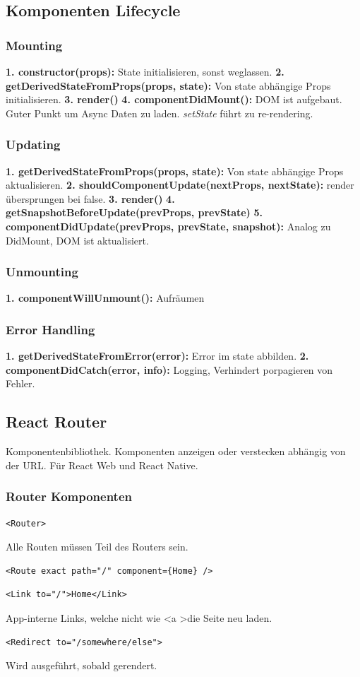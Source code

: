 \subsection{Komponenten Lifecycle}
\subsubsection{Mounting}
\textbf{1. constructor(props):} State initialisieren, sonst weglassen.
\textbf{2. getDerivedStateFromProps(props, state):} Von state abhängige Props initialisieren.
\textbf{3. render()}
\textbf{4. componentDidMount():} DOM ist aufgebaut. Guter Punkt um Async Daten zu laden. \textit{setState} führt zu re-rendering.

\subsubsection{Updating}
\textbf{1. getDerivedStateFromProps(props, state):} Von state abhängige Props aktualisieren.
\textbf{2. shouldComponentUpdate(nextProps, nextState):} render übersprungen bei false.
\textbf{3. render()}
\textbf{4. getSnapshotBeforeUpdate(prevProps, prevState)}
\textbf{5. componentDidUpdate(prevProps, prevState, snapshot):} Analog zu DidMount, DOM ist aktualisiert.

\subsubsection{Unmounting}
\textbf{1. componentWillUnmount():} Aufräumen

\subsubsection{Error Handling}
\textbf{1. getDerivedStateFromError(error):} Error im state abbilden.
\textbf{2. componentDidCatch(error, info):} Logging, Verhindert porpagieren von Fehler.

\subsection{React Router}
Komponentenbibliothek.
Komponenten anzeigen oder verstecken abhängig von der URL.
Für React Web und React Native.

\subsubsection{Router Komponenten}
\begin{lstlisting}
<Router>
\end{lstlisting}
Alle Routen müssen Teil des Routers sein.
\begin{lstlisting}
<Route exact path="/" component={Home} />
\end{lstlisting}
\begin{lstlisting}
<Link to="/">Home</Link>
\end{lstlisting}
App-interne Links, welche nicht wie \textless a \textgreater die Seite neu laden.
\begin{lstlisting}
<Redirect to="/somewhere/else">
\end{lstlisting}
Wird ausgeführt, sobald gerendert.

